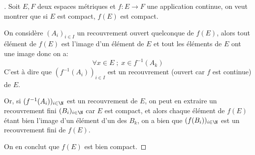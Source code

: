 \documentclass{report}
\begin{document}
      \subsection*{}
      \begin{proof}[\unskip\nopunct]
         Soit \(E, F\) deux espaces métriques et \(f : E \rightarrow F\) une application continue, on veut montrer que si \(E\) est compact, \(f(E)\) est compact.\<

         On considère \((A_i)_{i \in I}\) un recouvrement ouvert quelconque de \(f(E)\), alors tout élément de \(f(E)\) est l'image d'un élément de \(E\) et tout les éléments de \(E\) ont une image donc on a:
         \[
            \forall x \in E \; ; \; x \in f^{-1}(A_k) 
         \] 
         C'est à dire que \((f^{-1}(A_i))_{i \in I}\) est un recouvrement (ouvert car \(f\) est continue) de \(E\).
         \<

         Or, si  \((f^{-1}(A_i))_{i \in \N}\) est un recouvrement de \(E\), on peut en extraire un recouvrement fini \((B_i)_{i \in \N}\) car \(E\) est compact, et alors chaque élément de \(f(E)\) étant bien l'image d'un élément d'un des \(B_k\), on a bien que \((f(B_i))_{i \in \N}\) est un recouvrement fini de \(f(E)\).\<

         On en conclut que \(f(E)\) est bien compact.
      \end{proof}
\end{document}
